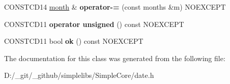 \begin{DoxyCompactItemize}
\mbox{\label{classdate_1_1month_a4d2fac9a0e9f8d3ea6f54e0c00a5d0c4}} 
C\+O\+N\+S\+T\+C\+D14 \mbox{\hyperlink{classdate_1_1month}{month}} \& {\bfseries operator-\/=} (const months \&m) N\+O\+E\+X\+C\+E\+PT
\item 
\mbox{\label{classdate_1_1month_a23300474b054bb6afb480767a8f3a5b0}} 
C\+O\+N\+S\+T\+C\+D11 {\bfseries operator unsigned} () const N\+O\+E\+X\+C\+E\+PT
\item 
\mbox{\label{classdate_1_1month_ab6518c7476d05f77ebe10838881e025a}} 
C\+O\+N\+S\+T\+C\+D11 bool {\bfseries ok} () const N\+O\+E\+X\+C\+E\+PT
\end{DoxyCompactItemize}


The documentation for this class was generated from the following file\+:\begin{DoxyCompactItemize}
\item 
D\+:/\+\_\+git/\+\_\+github/simplelibs/\+Simple\+Core/date.\+h\end{DoxyCompactItemize}
